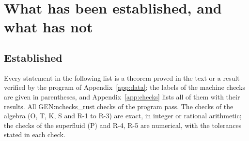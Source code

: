 \section{What has been established, and what has not}
\label{sec:status}

\subsection{Established}

Every statement in the following list is a theorem proved in the text or a result verified by the
program of Appendix~\ref{app:data}; the labels of the machine checks are given in parentheses, and
Appendix~\ref{app:checks} lists all of them with their results. All {{GEN:nchecks_rust}} checks of the
program pass. The checks of the algebra (O, T, K, S and R-1 to R-3) are exact, in integer or rational
arithmetic; the checks of the superfluid (P) and R-4, R-5 are numerical, with the tolerances stated in
each check.
